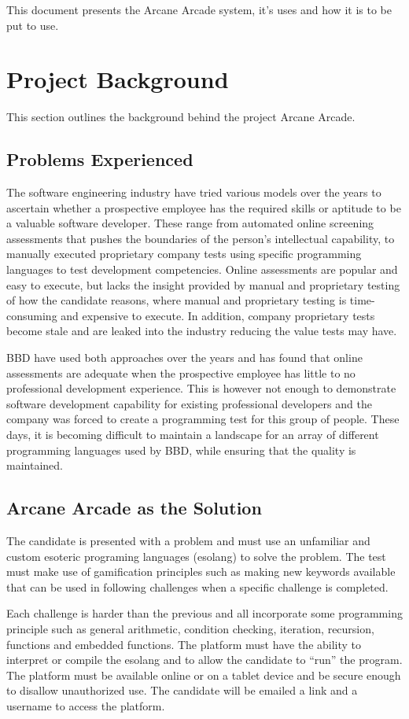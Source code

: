 \documentclass[english]{article}
\begin{document}
		 This document presents the Arcane Arcade system, it's uses and how it is to be put to use.

	\section{Project Background}
	This section outlines the background behind the project Arcane Arcade.
		\subsection{Problems Experienced}
		The software engineering industry have tried various models over the years to ascertain whether a prospective employee has the required skills or aptitude to be a valuable software developer. These range from automated online screening assessments that pushes the boundaries of the person’s intellectual capability, to manually executed proprietary company tests using specific programming languages to test development competencies. Online assessments are popular and easy to execute, but lacks the insight provided by manual and proprietary testing of how the candidate reasons, where manual and proprietary testing is time-consuming and expensive to execute. In addition, company proprietary tests become stale and are leaked into the industry reducing the value tests may have.
		
		BBD have used both approaches over the years and has found that online assessments are adequate when the prospective employee has little to no professional development experience. This is however not enough to demonstrate software development capability for existing professional developers and the company was forced to create a programming test for this group of people. These days, it is becoming difficult to maintain a landscape for an array of different programming languages used by BBD, while ensuring that the quality is maintained.

		\subsection{Arcane Arcade as the Solution}
		The candidate is presented with a problem and must use an unfamiliar and custom esoteric programing languages (esolang) to solve the problem. The test must make use of gamification principles such as making new keywords available that can be used in following challenges when a specific challenge is completed. 
		
		Each challenge is harder than the previous and all incorporate some programming principle such as general arithmetic, condition checking, iteration, recursion, functions and embedded functions. The platform must have the ability to interpret or compile the esolang and to allow the candidate to “run” the program. The platform must be available online or on a tablet device and be secure enough to disallow unauthorized use. The candidate will be emailed a link and a username to access the platform. 
		
\end{document}
